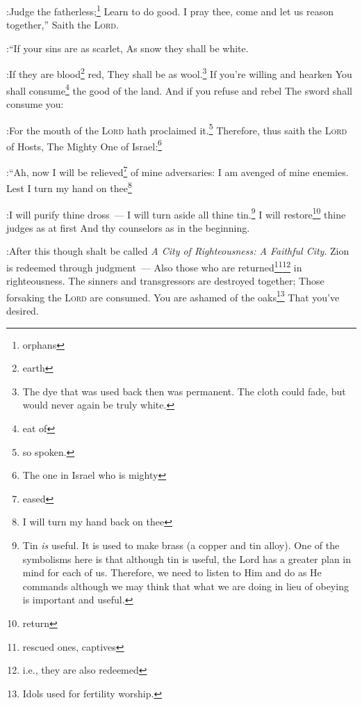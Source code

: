 
\begin{inparaenum}
    
    :Judge the fatherless;\footnote{orphans} Learn to do good.%
     I pray thee, come and let us reason together,'' Saith the \textsc{Lord}.%

:``If your sins are as scarlet, As snow they shall be white.%

:If they are blood\footnote{earth} red, They shall be as wool.\footnote{The dye that was used back then was permanent. The cloth could fade, but would never again be truly white.}%
     If you're willing and hearken You shall consume\footnote{eat of} the good of the land.%
     And if you refuse and rebel The sword shall consume you:%

:For the mouth of the \textsc{Lord} hath proclaimed it.\footnote{so spoken.}%
     Therefore, thus saith the \textsc{Lord} of Hosts, The Mighty One of Israel:\footnote{The one in Israel who is mighty}%

:``Ah, now I will be relieved\footnote{eased} of mine adversaries: I am avenged of mine enemies.%
     Lest I turn my hand on thee\footnote{I will turn my hand back on thee}%

:I will purify thine dross~--- I will turn aside all thine tin.\footnote{Tin \emph{is} useful. It is used to make brass (a copper and tin alloy). One of the symbolisms here is that although tin is useful, the Lord has a greater plan in mind for each of us. Therefore, we need to listen to Him and do as He commands although we may think that what we are doing in lieu of obeying is important and useful.}%
     I will restore\footnote{return} thine judges as at first And thy counselors as in the beginning.%

:After this though shalt be called \textit{A City of Righteousness: A Faithful City}.%
     Zion is redeemed through judgment~--- Also those who are returned\footnote{rescued ones, captives}\footnote{i.e., they are also redeemed} in righteousness.%
     The sinners and transgressors are destroyed together; Those forsaking the \textsc{Lord} are consumed.%
     You are ashamed of the oaks\footnote{Idols used for fertility worship.} That you've desired.%


\end{inparaenum}
